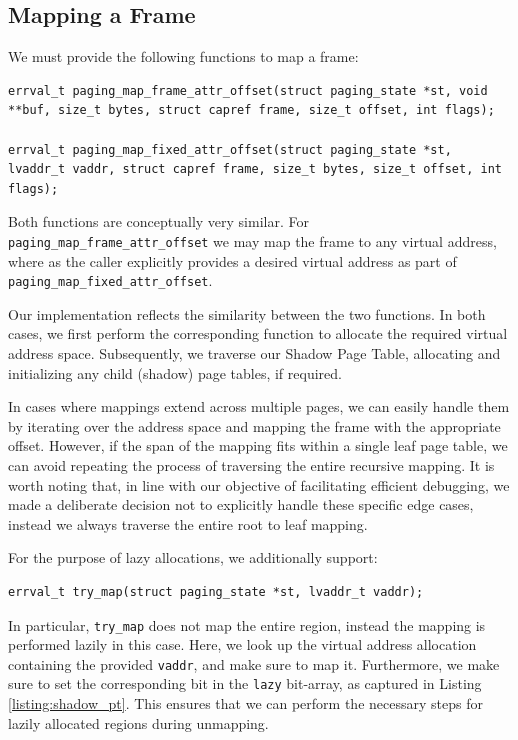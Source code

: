 \subsection{Mapping a Frame}

We must provide the following functions to map a frame:
\begin{lstlisting}[caption={Mapping a Frame}]
errval_t paging_map_frame_attr_offset(struct paging_state *st, void **buf, size_t bytes, struct capref frame, size_t offset, int flags);

errval_t paging_map_fixed_attr_offset(struct paging_state *st, lvaddr_t vaddr, struct capref frame, size_t bytes, size_t offset, int flags);
\end{lstlisting}

Both functions are conceptually very similar. For \texttt{paging\_map\_frame\_attr\_offset} we may map the frame to any virtual address, where as the caller explicitly provides a desired virtual address as part of \texttt{paging\_map\_fixed\_attr\_offset}.

Our implementation reflects the similarity between the two functions. In both cases, we first perform the corresponding function to allocate the required virtual address space. Subsequently, we traverse our Shadow Page Table, allocating and initializing any child (shadow) page tables, if required.

In cases where mappings extend across multiple pages, we can easily handle them by iterating over the address space and mapping the frame with the appropriate offset. However, if the span of the mapping fits within a single leaf page table, we can avoid repeating the process of traversing the entire recursive mapping. It is worth noting that, in line with our objective of facilitating efficient debugging, we made a deliberate decision not to explicitly handle these specific edge cases, instead we always traverse the entire root to leaf mapping.

For the purpose of lazy allocations, we additionally support:
\begin{lstlisting}[caption={Mapping a Frame (Lazy)}]
    errval_t try_map(struct paging_state *st, lvaddr_t vaddr);
\end{lstlisting}
In particular, \texttt{try\_map} does not map the entire region, instead the mapping is performed lazily in this case. Here, we look up the virtual address allocation containing the provided \texttt{vaddr}, and make sure to map it. Furthermore, we make sure to set the corresponding bit in the \texttt{lazy} bit-array, as captured in Listing \ref{listing:shadow_pt}. This ensures that we can perform the necessary steps for lazily allocated regions during unmapping. 

